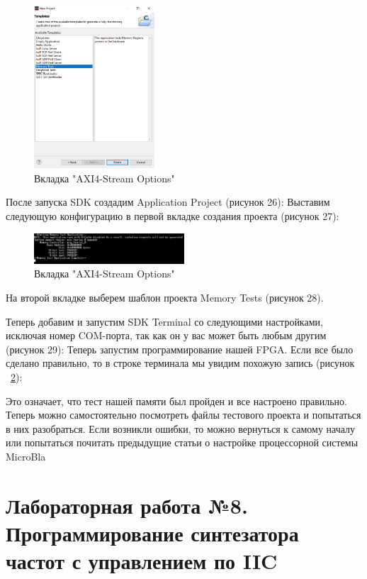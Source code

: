 \documentclass[a4paper,oneside ,14pt]{extreport}
\begin{document}
\begin{figure}[h]
	\centering
	\includegraphics[width=0.4\textwidth]{image/mig_m_sdk_1.png}
	\caption{Вкладка "AXI4-Stream Options"}
	\label{mig_m_sdk_1}
\end{figure}

    После запуска SDK создадим Application Project (рисунок 26):
    Выставим следующую конфигурацию в первой вкладке создания проекта (рисунок 27):
\begin{figure}[h]
	\centering
	\includegraphics[width=0.5\textwidth]{image/mig_result.png}
	\caption{Вкладка "AXI4-Stream Options"}
	\label{mig_result}
\end{figure}
    На второй вкладке выберем шаблон проекта Memory Tests (рисунок 28).

    Теперь добавим и запустим SDK Terminal со следующими настройками, исключая номер COM-порта, так как он у вас может быть любым другим (рисунок 29):
    Теперь запустим программирование нашей FPGA. Если все было сделано правильно, то в строке терминала мы увидим похожую запись (рисунок ~\ref{mig_result}):

 Это означает, что тест нашей памяти был пройден и все настроено правильно. Теперь можно самостоятельно посмотреть файлы тестового проекта и попытаться в них разобраться. Если возникли ошибки, то можно вернуться к самому началу или попытаться почитать предыдущие статьи о настройке процессорной системы MicroBla

\chapter{Лабораторная работа №8. Программирование синтезатора частот с управлением по IIC}
\end{document}
